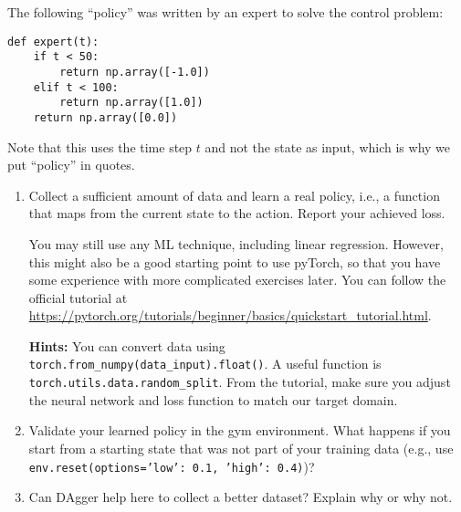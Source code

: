 The following ``policy'' was written by an expert to solve the control problem:
\begin{code}
\begin{Verbatim}[numbers=none,fontsize=\footnotesize]
def expert(t):
    if t < 50:
        return np.array([-1.0])
    elif t < 100:
        return np.array([1.0])
    return np.array([0.0])
\end{Verbatim} 
\end{code}

Note that this uses the time step $t$ and not the state as input, which is why we put ``policy'' in quotes. 

\begin{enumerate}
\item Collect a sufficient amount of data and learn a real policy, i.e., a function that maps from the current state to the action. Report your achieved loss.

You may still use any ML technique, including linear regression. However, this might also be a good starting point to use pyTorch, so that you have some experience with more complicated exercises later. You can follow the official tutorial at {\urlfont\url{https://pytorch.org/tutorials/beginner/basics/quickstart_tutorial.html}}.

\textbf{Hints:} You can convert data using \texttt{torch.from\_numpy(data\_input).float()}. A useful function is\\ \texttt{torch.utils.data.random\_split}. From the tutorial, make sure you adjust the neural network and loss function to match our target domain.


\item Validate your learned policy in the gym environment. What happens if you start from a starting state that was not part of your training data (e.g., use \texttt{env.reset(options={'low': 0.1, 'high': 0.4})})?


\item Can DAgger help here to collect a better dataset? Explain why or why not.


\end{enumerate}


\ifthenelse{\isundefined{\scripthead}}{


}{}


\exerfoot
